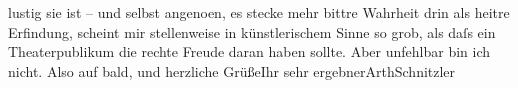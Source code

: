 \begin{ledgroupsized}[t]{13cm}
                    lustig sie ist – und selbst angeno{\geminationm}en, es stecke
                    mehr bittre Wahrheit drin als heitre Erfindung, scheint mir stellenweise in
                    künstlerischem Sinne so grob, als daſs ein Theaterpublikum die rechte Freude
                    daran haben sollte.\pend
           \pstart Aber unfehlbar bin ich nicht. Also auf bald, und herzliche Grüße\hspace*{1.5em}Ihr sehr ergebner\spacefill\mbox{ArthSchnitzler}\pend{}          \endnumbering{}\end{ledgroupsized}  \newcommand{\dateiname}{L02512}\newcommand{\titel}{Arthur Schnitzler an Robert Adam, 14. 6. 1929}\newcommand{\editorInnen}{Martin Anton Müller und Gerd-Hermann Susen}
            \footnotesize
\begin{ledgroupsized}[t]{11.5cm}
\end{ledgroupsized}
         
      
